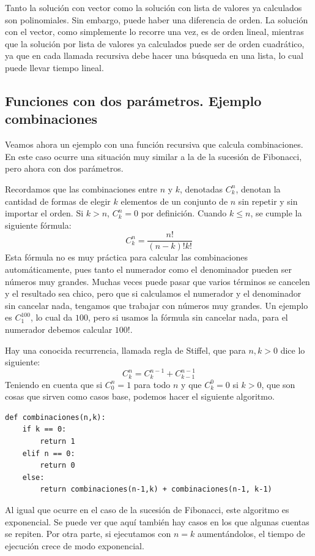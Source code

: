 \documentclass[a4paper, 12pt]{report}
\theoremstyle{definition}
\begin{document}
Tanto la solución con vector como la solución con lista de valores ya calculados son polinomiales. Sin embargo, puede haber una diferencia de orden. La solución con el vector, como simplemente lo recorre una vez, es de orden lineal, mientras que la solución por lista de valores ya calculados puede ser de orden cuadrático, ya que en cada llamada recursiva debe hacer una búsqueda en una lista, lo cual puede llevar tiempo lineal.

\subsection{Funciones con dos parámetros. Ejemplo combinaciones}

Veamos ahora un ejemplo con una función recursiva que calcula combinaciones. En este caso ocurre una situación muy similar a la de la sucesión de Fibonacci, pero ahora con dos parámetros.

Recordamos que las combinaciones entre $n$ y $k$, denotadas $C^n_k$, denotan la cantidad de formas de elegir $k$ elementos de un conjunto de $n$ sin repetir y sin importar el orden. Si $k>n$, $C^n_k=0$ por definición. Cuando $k\leq n$, se cumple la siguiente fórmula:
$$C^n_k = \frac{n!}{(n-k)!k!}
$$
Esta fórmula no es muy práctica para calcular las combinaciones automáticamente, pues tanto el numerador como el denominador pueden ser números muy grandes. Muchas veces puede pasar que varios términos se cancelen y el resultado sea chico, pero que si calculamos el numerador y el denominador sin cancelar nada, tengamos que trabajar con números muy grandes. Un ejemplo es $C^{100}_1$, lo cual da $100$, pero si usamos la fórmula sin cancelar nada, para el numerador debemos calcular $100!$.

Hay una conocida recurrencia, llamada regla de Stiffel, que para $n,k>0$ dice lo siguiente:
$$C^n_k = C^{n-1}_k+C^{n-1}_{k-1}
$$
Teniendo en cuenta que si $C^n_0=1$ para todo $n$ y que $C^0_k=0$ si $k>0$, que son cosas que sirven como casos base, podemos hacer el siguiente algoritmo.
\begin{verbatim}
def combinaciones(n,k):
    if k == 0:
        return 1
    elif n == 0:
        return 0
    else:
        return combinaciones(n-1,k) + combinaciones(n-1, k-1)
\end{verbatim}
Al igual que ocurre en el caso de la sucesión de Fibonacci, este algoritmo es exponencial. Se puede ver que aquí también hay casos en los que algunas cuentas se repiten. Por otra parte, si ejecutamos con $n=k$ aumentándolos, el tiempo de ejecución crece de modo exponencial.
\end{document}
